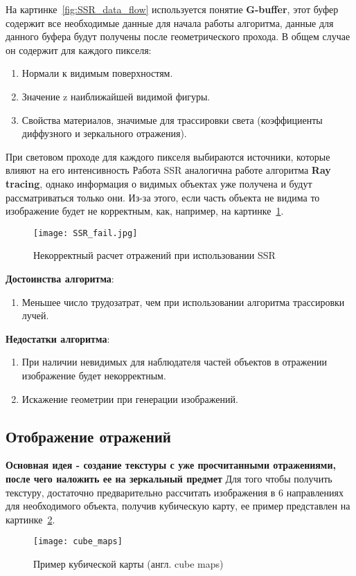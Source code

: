 На картинке~\ref{fig:SSR_data_flow} используется понятие \textbf{G-buffer}, этот буфер содержит все необходимые данные для начала работы алгоритма, данные для данного буфера
будут получены после геометрического прохода. В общем случае он содержит для каждого пикселя:
\begin{enumerate}
	\item Нормали к видимым поверхностям.
	\item Значение z наиближайшей видимой фигуры.
	\item Свойства материалов, значимые для трассировки света (коэффициенты диффузного и зеркального отражения).
\end{enumerate}
При световом проходе для каждого пикселя выбираются источники, которые влияют на его интенсивность
Работа SSR аналогична работе алгоритма \textbf{Ray tracing}, однако информация о видимых объектах уже получена и будут рассматриваться только они.
Из-за этого, если часть объекта не видима то изображение будет не корректным, как, например, на картинке~\ref{fig:SSR_fail}.\cite{SSR,reflexion_types}
\begin{figure}[H]
	\centering
	\texttt{[image: SSR\_fail.jpg]}
	\caption{Некорректный расчет отражений при использовании SSR}
	\label{fig:SSR_fail}
\end{figure} 

\textbf{Достоинства алгоритма}:
\begin{enumerate}
	\item Меньшее число трудозатрат, чем при использовании алгоритма трассировки лучей. \cite{SSR}
\end{enumerate}

\textbf{Недостатки алгоритма}:
\begin{enumerate}
	\item При наличии невидимых для наблюдателя частей объектов в отражении изображение будет некорректным. \cite{SSR}
	\item Искажение геометрии при генерации изображений. \cite{SSR}
\end{enumerate}

\subsection{Отображение отражений}
\textbf{Основная идея - создание текстуры с уже просчитанными отражениями, после чего наложить ее на зеркальный предмет} 
Для того чтобы получить текстуру, достаточно предварительно рассчитать изображения в 6 направлениях для необходимого объекта, получив кубическую карту, ее пример представлен на картинке~\ref{fig:cube_maps}.\cite{reflexion_types}
\begin{figure}[h]
	\centering
	\texttt{[image: cube\_maps]}
	\caption{Пример кубической карты (англ. cube maps)}
	\label{fig:cube_maps}
\end{figure}


